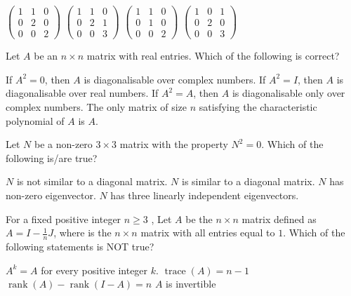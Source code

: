 \documentclass[10pt]{exam}
\DeclareMathOperator{\rank}{\text{rank}}
\DeclareMathOperator{\trace}{\text{trace}}
\begin{document}
\begin{questions}
\begin{oneparchoices}
\choice $\begin{pmatrix} 1 & 1 & 0 \\ 0 & 2 & 0 \\ 0 & 0 & 2 \end{pmatrix}$
\choice $\begin{pmatrix} 1 & 1 & 0 \\ 0 & 2 & 1 \\ 0 & 0 & 3  \end{pmatrix}$
\choice $\begin{pmatrix} 1 & 1 & 0 \\ 0 & 1  & 0 \\ 0 & 0 & 2 \end{pmatrix}$
\choice $\begin{pmatrix} 1 & 0 & 1 \\ 0 & 2 & 0 \\ 0 & 0 & 3 \end{pmatrix}$
\end{oneparchoices}

\question
Let $A$ be an $n \times n$ matrix with real entries. Which of the following is correct?

\begin{choices}
\choice If $A^2=0$, then $A$ is diagonalisable over complex numbers. 
\choice If $A^2=I$, then $A$ is diagonalisable over real numbers.
\choice If $A^2=A$, then $A$ is diagonalisable only over complex numbers.
\choice The only matrix of size $n$ satisfying the characteristic polynomial of $A$ is $A$.
\end{choices}

\question
Let $N$ be a non-zero $3\times 3$ matrix with the property $N^2=0$. Which of the following is/are true?

\begin{checkboxes}
\choice $N$ is not similar to a diagonal matrix.
\choice $N$ is similar to a diagonal matrix.
\choice $N$ has non-zero eigenvector.
\choice $N$ has three linearly independent eigenvectors.
\end{checkboxes}

\question 
For a fixed positive integer $n \geq 3$ , Let $A$ be the $n\times n$ matrix defined as $A=I-\frac{1}{n}J$, where is the $n\times n$
matrix with all entries equal to $1$. Which of the following statements is NOT true?

\begin{choices}
\choice $A^k=A$ for every positive integer $k$.
\choice $\trace(A)=n-1$
\choice $\rank(A)-\rank(I-A)=n$
\choice $A$ is invertible
\end{choices}


\end{questions}
\end{document}
